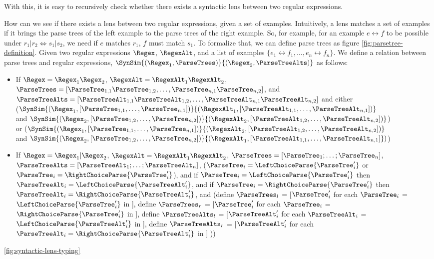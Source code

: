 With this, it is easy to recursively check whether there exists a syntactic lens between two regular expressions.

How can we see if there exists a lens between two regular expressions, given a set of examples.
Intuitively, a lens matches a set of examples if it brings the parse trees of the left example to the parse trees of the right example.
So, for example, for an example $e\leftrightarrow f$ to be possible under $r_1|r_2 \Leftrightarrow s_1|s_2$, we need if $e$ matches $r_1$, $f$ must match $s_1$.
To formalize that, we can define parse trees as figure \ref{fig:parsetree-definition}.
Given two regular expressions $\Regex$, $\RegexAlt$, and a list of examples $\{e_1\leftrightarrow f_1,\ldots,e_n\leftrightarrow f_n\}$.
We define a relation between parse trees and regular expressions, $\SynSim{(\Regex_1,\ParseTrees)}{(\Regex_2,\ParseTreeAlts)}$ as follows:
\begin{itemize}
\item If $\Regex = \Regex_1 \Regex_2$,
$\RegexAlt = \RegexAlt_1 \RegexAlt_2$,
$\ParseTrees = [\ParseTree_{1,1}\ParseTree_{1,2}, \ldots, \ParseTree_{n,1}\ParseTree_{n,2}]$,
and $\ParseTreeAlts = [\ParseTreeAlt_{1,1}\ParseTreeAlt_{1,2}, \ldots, \ParseTreeAlt_{n,1}\ParseTreeAlt_{n,2}]$
and either\\
($\SynSim{(\Regex_1,[\ParseTree_{1,1}, \ldots,\ParseTree_{n,1}])}{(\RegexAlt_1,[\ParseTreeAlt_{1,1}, \ldots, \ParseTreeAlt_{n,1}])}$\\
and
$\SynSim{(\Regex_2,[\ParseTree_{1,2}, \ldots,\ParseTree_{n,2}])}{(\RegexAlt_2,[\ParseTreeAlt_{1,2}, \ldots, \ParseTreeAlt_{n,2}])}$)\\
or ($\SynSim{(\Regex_1,[\ParseTree_{1,1}, \ldots,\ParseTree_{n,1}])}{(\RegexAlt_2,[\ParseTreeAlt_{1,2}, \ldots, \ParseTreeAlt_{n,2}])}$\\
and
$\SynSim{(\Regex_2,[\ParseTree_{1,2}, \ldots,\ParseTree_{n,2}])}{(\RegexAlt_1,[\ParseTreeAlt_{1,1}, \ldots, \ParseTreeAlt_{n,1}]})$)
\item If $\Regex = \Regex_1 | \Regex_2$,
$\RegexAlt = \RegexAlt_1 \RegexAlt_2$,
$\ParseTrees = [\ParseTree_1;\ldots;\ParseTree_n]$, $\ParseTreeAlts = [\ParseTreeAlt_1;\ldots;\ParseTreeAlt_n]$,
($\ParseTree_i = \LeftChoiceParse{\ParseTree_i'}$ or $\ParseTree_i = \RightChoiceParse{\ParseTree_i'}$),
and if $\ParseTree_i = \LeftChoiceParse{\ParseTree_i'}$ then $\ParseTreeAlt_i = \LeftChoiceParse{\ParseTreeAlt_i'}$,
and if $\ParseTree_i = \RightChoiceParse{\ParseTree_i'}$ then $\ParseTreeAlt_i = \RightChoiceParse{\ParseTreeAlt_i'}$,
and (define $\ParseTrees_l$ = [$\ParseTree_i'$ for each $\ParseTree_i$ = $\LeftChoiceParse{\ParseTree_i'}$ in \ParseTrees],
define $\ParseTrees_r$ = [$\ParseTree_i'$ for each $\ParseTree_i$ = $\RightChoiceParse{\ParseTree_i'}$ in \ParseTrees],
define $\ParseTreeAlts_l$ = [$\ParseTreeAlt_i'$ for each $\ParseTreeAlt_i$ = $\LeftChoiceParse{\ParseTreeAlt_i'}$ in \ParseTreeAlts],
define $\ParseTreeAlts_r$ = [$\ParseTreeAlt_i'$ for each $\ParseTreeAlt_i = \RightChoiceParse{\ParseTreeAlt_i'}$ in \ParseTreeAlts]
))
\end{itemize}
\ref{fig:syntactic-lens-typing}
\fi



